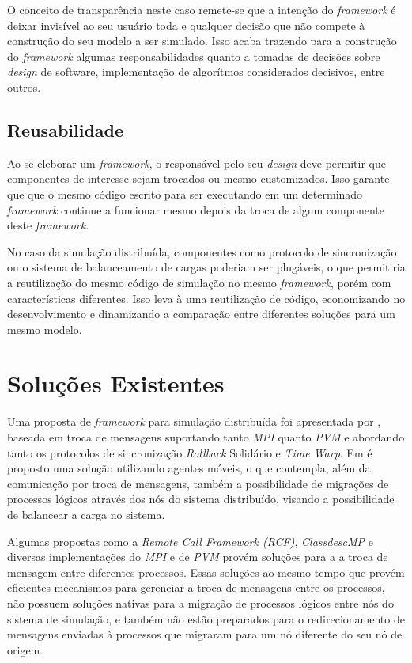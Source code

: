 O conceito de transparência neste caso remete-se que a intenção do \textit{framework} é deixar invisível ao seu usuário toda e qualquer decisão que não compete à construção do seu modelo a ser simulado. Isso acaba trazendo para a construção do \textit{framework} algumas responsabilidades quanto a tomadas de decisões sobre \textit{design} de software, implementação de algorítmos considerados decisivos, entre outros.

\subsection{Reusabilidade}

Ao se eleborar um \textit{framework}, o responsável pelo seu \textit{design} deve permitir que componentes de interesse sejam trocados ou mesmo customizados. Isso garante que que o mesmo código escrito para ser executando em um determinado \textit{framework} continue a funcionar mesmo depois da troca de algum componente deste \textit{framework}.

No caso da simulação distribuída, componentes como protocolo de sincronização ou o sistema de balanceamento de cargas poderiam ser plugáveis, o que permitiria a reutilização do mesmo código de simulação no mesmo \textit{framework}, porém com características diferentes. Isso leva à uma reutilização de código, economizando no desenvolvimento e dinamizando a comparação entre diferentes soluções para um mesmo modelo.

\section{Soluções Existentes \label{solucoes_existentes}}

Uma proposta de \textit{framework} para simulação distribuída foi apresentada por \cite{LIVERSON}, baseada em troca de mensagens suportando tanto \textit{MPI} quanto \textit{PVM} e abordando tanto os protocolos de sincronização \textit{Rollback} Solidário e \textit{Time Warp}. Em \cite{RIBEIROALVES} é proposto uma solução utilizando agentes móveis, o que contempla, além da comunicação por troca de mensagens, também a possibilidade de migrações de processos lógicos através dos nós do sistema distribuído, visando a possibilidade de balancear a carga no sistema.

Algumas propostas como a \textit{Remote Call Framework (RCF)}, \textit{ClassdescMP} e diversas implementações do \textit{MPI} e de \textit{PVM} provém soluções para a a troca de mensagem entre diferentes processos. Essas soluções ao mesmo tempo que provém eficientes mecanismos para gerenciar a troca de mensagens entre os processos, não possuem soluções nativas para a migração de processos lógicos entre nós do sistema de simulação, e também não estão preparados para o redirecionamento de mensagens enviadas à processos que migraram para um nó diferente do seu nó de origem.

